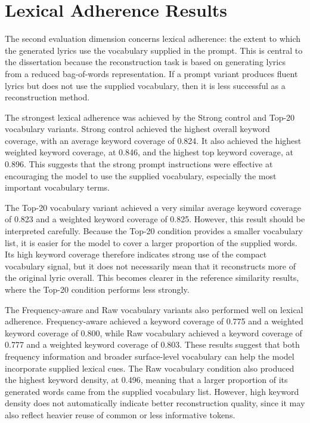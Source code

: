 \section{Lexical Adherence Results}

The second evaluation dimension concerns lexical adherence: the extent to which the generated lyrics use the vocabulary supplied in the prompt. This is central to the dissertation because the reconstruction task is based on generating lyrics from a reduced bag-of-words representation. If a prompt variant produces fluent lyrics but does not use the supplied vocabulary, then it is less successful as a reconstruction method.

The strongest lexical adherence was achieved by the Strong control and Top-20 vocabulary variants. Strong control achieved the highest overall keyword coverage, with an average keyword coverage of 0.824. It also achieved the highest weighted keyword coverage, at 0.846, and the highest top keyword coverage, at 0.896. This suggests that the strong prompt instructions were effective at encouraging the model to use the supplied vocabulary, especially the most important vocabulary terms.

The Top-20 vocabulary variant achieved a very similar average keyword coverage of 0.823 and a weighted keyword coverage of 0.825. However, this result should be interpreted carefully. Because the Top-20 condition provides a smaller vocabulary list, it is easier for the model to cover a larger proportion of the supplied words. Its high keyword coverage therefore indicates strong use of the compact vocabulary signal, but it does not necessarily mean that it reconstructs more of the original lyric overall. This becomes clearer in the reference similarity results, where the Top-20 condition performs less strongly.

The Frequency-aware and Raw vocabulary variants also performed well on lexical adherence. Frequency-aware achieved a keyword coverage of 0.775 and a weighted keyword coverage of 0.800, while Raw vocabulary achieved a keyword coverage of 0.777 and a weighted keyword coverage of 0.803. These results suggest that both frequency information and broader surface-level vocabulary can help the model incorporate supplied lexical cues. The Raw vocabulary condition also produced the highest keyword density, at 0.496, meaning that a larger proportion of its generated words came from the supplied vocabulary list. However, high keyword density does not automatically indicate better reconstruction quality, since it may also reflect heavier reuse of common or less informative tokens.

